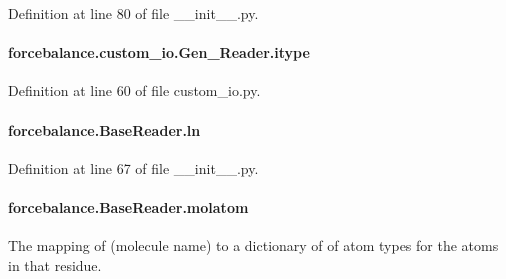 Definition at line 80 of file \-\_\-\-\_\-init\-\_\-\-\_\-.\-py.

\hypertarget{classforcebalance_1_1custom__io_1_1Gen__Reader_a4712ebcb615c785b66f48c78e5ee5739}{
\paragraph[{itype}]{\setlength{\rightskip}{0pt plus 5cm}forcebalance.\-custom\-\_\-io.\-Gen\-\_\-\-Reader.\-itype}}\label{classforcebalance_1_1custom__io_1_1Gen__Reader_a4712ebcb615c785b66f48c78e5ee5739}


Definition at line 60 of file custom\-\_\-io.\-py.

\hypertarget{classforcebalance_1_1BaseReader_a80c8e3bea212600742968aa8669e557b}{
\paragraph[{ln}]{\setlength{\rightskip}{0pt plus 5cm}forcebalance.\-Base\-Reader.\-ln\hspace{0.3cm}{\ttfamily [inherited]}}}\label{classforcebalance_1_1BaseReader_a80c8e3bea212600742968aa8669e557b}


Definition at line 67 of file \-\_\-\-\_\-init\-\_\-\-\_\-.\-py.

\hypertarget{classforcebalance_1_1BaseReader_ab444c213e15929253dd73395ac5f19fc}{
\paragraph[{molatom}]{\setlength{\rightskip}{0pt plus 5cm}forcebalance.\-Base\-Reader.\-molatom\hspace{0.3cm}{\ttfamily [inherited]}}}\label{classforcebalance_1_1BaseReader_ab444c213e15929253dd73395ac5f19fc}


The mapping of (molecule name) to a dictionary of of atom types for the atoms in that residue. 

